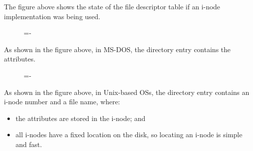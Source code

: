 \documentclass[a4paper]{systems-software}
\begin{document}
The figure above shows the state of the file descriptor table if an i-node implementation was being used.

\begin{figure}[H]
  \lineskip=-\fboxrule
\end{figure}

As shown in the figure above, in MS-DOS, the directory entry contains the attributes.

\begin{figure}[H]
  \lineskip=-\fboxrule
\end{figure}

As shown in the figure above, in Unix-based OSs, the directory entry contains an i-node number and a file name, where:
\begin{itemize}
	\item the attributes are stored in the i-node; and
	\item all i-nodes have a fixed location on the disk, so locating an i-node is simple and fast.
\end{itemize}
\end{document}
